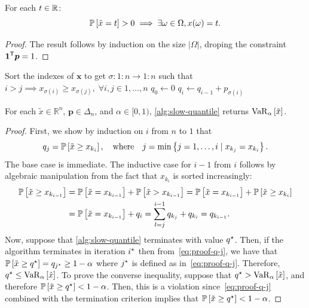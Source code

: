\documentclass[10pt]{article} %
\begin{document}
\begin{lemma} \label{lem:prob-lumpy}
For each $t\in \Real$:
  \[
    \P{\tilde{x} = t} > 0
    \implies
    \exists \omega \in \Omega, x(\omega) = t.
  \]
\end{lemma}
\begin{proof}
The result follows by induction on the size $|\Omega|$, droping the constraint $\bm{1}\tr \bm{p} = 1$.
\end{proof}



\begin{algorithm}
\caption{VaR: Standard VaR algorithm}
\label{alg:slow-quantile}
\Input{$\bm{x}\in \Real^n$, $\bm{p}\in \Delta_n$, and $\alpha \in [0,1)$}
\Output{$\varo_{\alpha}[\tilde{x}]$}
Sort the indexes of $\bm{x}$ to get $\sigma \colon 1{:}n \to 1{:}n$ such that $i > j \implies x_{\sigma(i)} \ge  x_{\sigma(j)}, \; \forall i, j \in 1, \dots , n$\;
$q_0 \gets 0$
 {
    $q_i \gets q_{i-1} + p_{\sigma(i)}$ \;
     {}
}
\end{algorithm}

\begin{proposition}
For each $\tilde{x} \in \mathbb{R}^n$, $\bm{p}\in \Delta_n$, and $\alpha\in [0,1)$, \cref{alg:slow-quantile} returns $\var{\alpha}{\tilde{x}}$.
\end{proposition}
\begin{proof}
First, we show by induction on $i$ from $n$ to $1$ that
\begin{equation} \label{eq:proof-q-j}
  q_j = \P{\tilde{x} \ge x_{k_i}},
  \quad\text{where}\quad
  j = \min \left\{ j = 1, \dots , i \mid x_{k_j} = x_{k_i} \right\}.
\end{equation}
The base case is immediate. The inductive case for $i-1$ from $i$ follows by algebraic manipulation from the fact that $x_{k_i}$ is sorted increasingly:
\begin{align*}
\P{\tilde{x} \ge x_{k_{i-1}}} 
 &= \P{\tilde{x} = x_{k_{i-1}}} + \P{\tilde{x} > x_{k_{i-1}}}
 = \P{\tilde{x} = x_{k_{i-1}}} + \P{\tilde{x} \ge x_{k_{i}}} \\
 &= \P{\tilde{x} = x_{k_{i-1}}} + q_i = \sum_{l=j}^{i-1} q_{k_j} + q_{k_i} = q_{k_{i-1}}.
\end{align*}
Now, suppose that \cref{alg:slow-quantile} terminates with value $q\opt$. Then, if the algorithm terminates in iteration $i\opt$ then from~\eqref{eq:proof-q-j}, we have that $\P{\tilde{x} \ge q\opt} = q_{j\opt} \ge 1-\alpha$ where $j\opt$ is defined as in~\eqref{eq:proof-q-j}. Therefore, $q\opt \le \var{\alpha}{\tilde{x}}$. To prove the converse inequality, suppose that $q\opt > \var{\alpha}{\tilde{x}}$, and therefore $\P{\tilde{x} \ge q\opt} < 1-\alpha$. Then, this is a violation since~\eqref{eq:proof-q-j} combined with the termination criterion implies that $\P{\tilde{x} \ge q\opt} < 1-\alpha$.
\end{proof}
\end{document}
